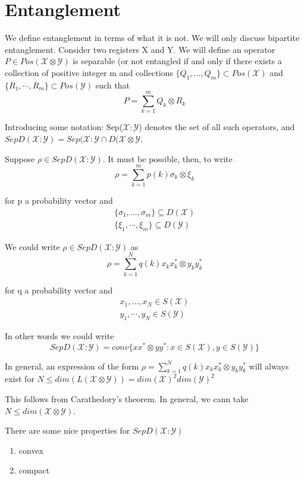 \documentclass{article}
\begin{document}
\section{Entanglement}

We define entanglement in terms of what it is not. We will only discuss
bipartite entanglement. Consider two registers X and Y. We will define an
operator $ P \in Pos(\mathcal{X} \otimes \mathcal{Y}) $  is separable (or not
entangled if and only if there exists a collection of positive integer m and
collections $\{Q_1, \ldots, Q_m\} \subset Pos(\mathcal{X})$ and
$\{R_1,\cdots,R_m\} \subset Pos(\mathcal{Y})$ such that 
\[ 
        P = \sum_{k=1}^m Q_k \otimes R_k 
\]

Introducing some notation: Sep($\mathcal{X}:\mathcal{Y}$) denotes
the set of all such operators, and $SepD(\mathcal{X}:\mathcal{Y}) =
Sep(\mathcal{X}:\mathcal{Y} \cap D(\mathcal{X} \otimes \mathcal{Y}$.

Suppose $\rho \in Sep D(\mathcal{X}:\mathcal{Y})$. It must
be possible, then, to write 
\[ 
        \rho = \sum_{k=1}^m p(k) \sigma_k \otimes \xi_k 
\]

for p a probability vector and 
\begin{align*}
    \{\sigma_1,\ldots,\sigma_m\} \subseteq D(\mathcal{X}) \\
    \{\xi_1,\cdots,\xi_m \} \subseteq D(\mathcal{Y})
\end{align*}

We could write $\rho \in SepD(\mathcal{X}:\mathcal{Y})$ as 
\[ 
        \rho = \sum_{k=1}^N q(k) x_k x_k^* \otimes y_k y_k^* 
\]

for q a probability vector and 
\begin{align*}
    x_1,\ldots,x_N \in S(\mathcal{X}) \\
    y_1,\cdots,y_N \in S(\mathcal{Y})
\end{align*}

In other words we could write 
\[
        SepD(\mathcal{X}:\mathcal{Y}) = conv\{ x x^* \otimes y y^*: x \in
        S(\mathcal{X}), y \in S(\mathcal{Y}) \}
\]

In general, an expression of the form $\rho = \sum_{k=1}^N q(k) x_k x_k^*
\otimes y_k y_k^*$ will always exist for $N \le
dim(L(\mathcal{X}\otimes\mathcal{Y})) = dim(\mathcal{X})^2dim(\mathcal{Y})^2$

This follows from Carathedory's theorem. In general, we cann take $N \le
dim(\mathcal{X} \otimes \mathcal{Y})$.

There are some nice properties for $SepD(\mathcal{X}:\mathcal{Y})$
\begin{enumerate}
    \item convex
    \item compact
\end{enumerate}
\end{document}
